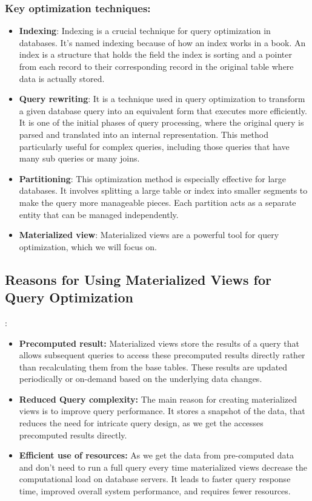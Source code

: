 \subsubsection{Key optimization techniques:}
 \begin{itemize}
     \item \textbf{Indexing}: Indexing is a crucial technique for query optimization in databases. It's named indexing because of how an index works in a book. An index is a structure that holds the field the index is sorting and a pointer from each record to their corresponding record in the original table where data is actually stored.\cite{tomar-2021,atlassian-no-date}
     \item \textbf{Query rewriting}: It is a technique used in query optimization to transform a given database query into an equivalent form that executes more efficiently. It is one of the initial phases of query processing, where the original query is parsed and translated into an internal representation. This method particularly useful for complex queries, including those queries that have many sub queries or many joins.\cite{pitoura-2009,unknown-IBM-25-2024}
     \item \textbf{Partitioning}: This optimization method is especially effective for large databases. It involves splitting a large table or index into smaller segments to make the query more manageable pieces. Each partition acts as a separate entity that can be managed independently.\cite{planck-2024} 
     \item \textbf{Materialized view}: Materialized views are a powerful tool for query optimization, which we will focus on. 
 \end{itemize}
 
 \subsection{Reasons for Using Materialized Views for Query Optimization}:
\begin{itemize}
    \item\textbf{Precomputed result:} Materialized views store the results of a query that allows subsequent queries to access these precomputed results directly rather than recalculating them from the base tables. These results are updated periodically or on-demand based on the underlying data changes.\cite{khan-2023,Risingwave-no-date}
    \item\textbf{Reduced Query complexity:} The main reason for creating materialized views is to improve query performance. It stores a snapshot of the data, that reduces the need for intricate query design, as we get the accesses precomputed results directly.\cite{Risingwave-no-date,Databricks-no-date}
    \item\textbf{Efficient use of resources:} As we get the data from pre-computed data and don't need to run a full query every time materialized views decrease the computational load on database servers. It leads to faster query response time, improved overall system performance, and requires fewer resources.\cite{google-no-date, khan-2023}
    
\end{itemize}\vspace{.4cm}

